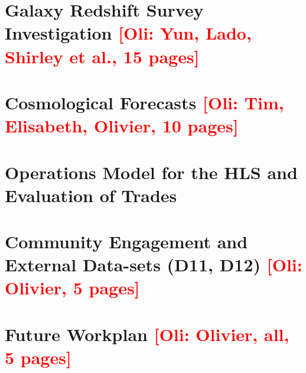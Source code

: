 \documentclass[letter]{ar-1col_WFIRST-HLS}
\newcommand{\Oli}[1]{\textcolor{red}{[{\bf Oli}: #1]}}
\begin{document}
\section{Galaxy Redshift Survey Investigation \Oli{Yun, Lado, Shirley et al., 15 pages}}
\label{sec:gc}


\section{Cosmological Forecasts \Oli{Tim, Elisabeth, Olivier, 10 pages}}
\label{sec:forecast}


\section{Operations Model for the HLS and Evaluation of Trades}
\label{sec:operation}


\section{Community Engagement and External Data-sets (D11, D12) \Oli{Olivier, 5 pages}}
\label{sec:engagement}


\section{Future Workplan \Oli{Olivier, all, 5 pages}}
\label{sec:workplan}


\clearpage
\newpage

\end{document}
